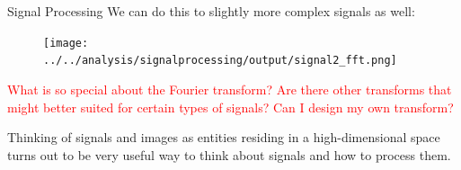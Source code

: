 \documentclass[aspectratio=169]{beamer}
\begin{document}
\begin{frame}{Signal Processing}
  We can do this to slightly more complex signals as well:
  \vspace{0.2cm}

  \begin{figure}
    \centering
    \texttt{[image: ../../analysis/signalprocessing/output/signal2\_fft.png]}
  \end{figure}

  \textcolor{red}{What is so special about the Fourier transform? Are there other transforms that might better suited for certain types of signals? Can I design my own transform?}
  \vspace{0.2cm}

  Thinking of signals and images as entities residing in a high-dimensional space turns out to be very useful way to think about signals and how to process them.
\end{frame}
\end{document}

